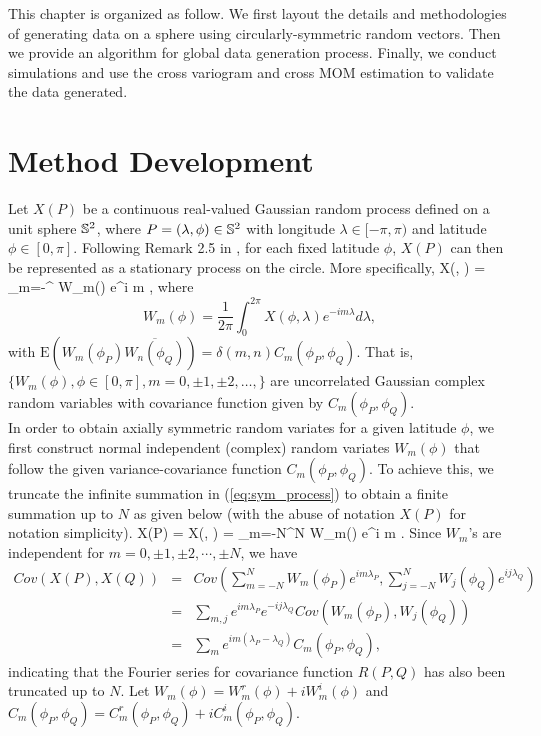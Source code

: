 This chapter is organized as follow. We first layout the details and methodologies of generating data on a sphere using circularly-symmetric random vectors. Then we provide an algorithm for global data generation process. Finally, we conduct simulations and use the cross variogram and cross \cov MOM estimation to validate the data generated.
		
	\section{Method Development}

Let $X(P)$ be a continuous real-valued Gaussian random process defined on a unit sphere $\mathbb{S}^2$, where $P = (\lambda, \phi) \in \mathbb{S}^2$ with longitude $\lambda \in [-\pi, \pi)$ and latitude $\phi \in [0, \pi]$. Following Remark 2.5 in \cite{Huang2012}, for each fixed latitude $\phi$, $X(P)$ can then be represented as a stationary process on the circle. More specifically,			
	\beq \label{eq:sym_process}
	X(\phi, \lambda) = \sum_{m=-\infty}^{\infty} W_m(\phi) e^{i m \lambda},
	\eeq
where
\[	
W_m(\phi) = \frac{1}{2\pi} \int_0^{2\pi} X(\phi, \lambda) e^{-i m \lambda} d \lambda,
\]
with $\mbox{E}(W_m(\phi_P) \overline{W_n(\phi_Q)}) = \delta{(m,n)} C_m(\phi_P, \phi_Q)$. That is, $\{W_m(\phi), \phi \in [0,\pi], m = 0, \pm 1, \pm 2, \ldots,\}$ are uncorrelated Gaussian complex random variables with covariance function given by $C_m(\phi_P, \phi_Q)$.\\		
			
In order to obtain axially symmetric random variates for a given latitude $\phi$, we first construct normal independent (complex) random variates $W_m(\phi)$ that follow the given  variance-covariance function $C_m(\phi_P, \phi_Q)$. To achieve this, we truncate the infinite summation in (\ref{eq:sym_process}) to obtain a finite summation up to $N$ as given below (with the abuse of notation $X(P)$ for notation simplicity).
	\beq
	X(P) = X(\phi, \lambda) = \sum_{m=-N}^{N} W_m(\phi) e^{i m \lambda}.
	\eeq
Since $W_m$'s are independent for $m =0, \pm 1, \pm 2, \cdots, \pm N$, we have			
	\begin{eqnarray*}
		Cov(X(P), {X(Q)}) &=& Cov\left(\sum_{m = -N}^{N} W_m(\phi_P) e^{i m \lambda_P}, \sum_{j=-N}^{N} {W_j(\phi_Q)} e^{i j \lambda_Q}\right) \\
		&=& \sum_{m, j} e^{i m \lambda_P} e^{-i j \lambda_Q} Cov(W_m(\phi_P), {W_j(\phi_Q)}) \\
		&=& \sum_{m} e^{im (\lambda_P - \lambda_Q)} C_m(\phi_P, \phi_Q),
	\end{eqnarray*}
indicating that the Fourier series for covariance function $R(P, Q)$ has also been truncated up to $N$. Let $W_m(\phi) = W_{m}^{r}(\phi) + i W_{m}^i(\phi)$ and $C_m(\phi_P, \phi_Q) = C_m^r(\phi_P, \phi_Q) + i C_m^i(\phi_P, \phi_Q)$. \\

